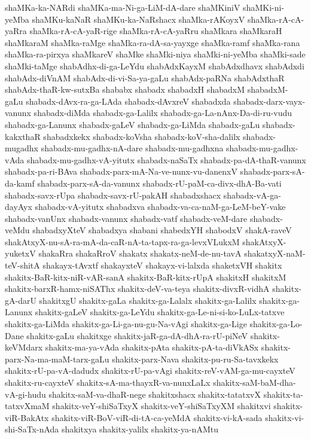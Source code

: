 {shaMKa-ka-NARdi
shaMKa-ma-Ni-ga-LiM-dA-dare
shaMKiniV
shaMKi-ni-yeMba
shaMKu-kaNaR
shaMKu-ka-NaRshacx
shaMka-rAKoyxV
shaMka-rA-cA-yaRra
shaMka-rA-cA-yaR-rige
shaMka-rA-cA-yaRru
shaMkara
shaMkaraH
shaMkaraM
shaMka-raMge
shaMka-ra-dA-sa-yayxge
shaMka-ramf
shaMka-rana
shaMka-ra-pirxya
shaMkareV
shaMke
shaMki-niya
shaMki-ni-yeMba
shaMki-sade
shaMki-taMge
shabAdhx-di-ga-LeYdu
shabAdxKayxM
shabAdxdhavx
shabAdxdi
shabAdx-diVnAM
shabAdx-di-vi-Sa-ya-gaLu
shabAdx-paRNa
shabAdxthaR
shabAdx-thaR-kw-sutxBa
shababx
shabadx
shabadxH
shabadxM
shabadxM-gaLu
shabadx-dAvx-ra-ga-LAda
shabadx-dAvxreV
shabadxda
shabadx-darx-vayx-vanunx
shabadx-diMda
shabadx-ga-Lalilx
shabadx-ga-La-nAnx-Da-di-ru-vudu
shabadx-ga-Lanunx
shabadx-gaLeV
shabadx-ga-LiMda
shabadx-gaLu
shabadx-kakxthaR
shabadxkekx
shabadx-koVsha
shabadx-koV-sha-dalilx
shabadx-mugadhx
shabadx-mu-gadhx-nA-dare
shabadx-mu-gadhxna
shabadx-mu-gadhx-vAda
shabadx-mu-gadhx-vA-yitutx
shabadx-naSaTx
shabadx-pa-dA-thaR-vanunx
shabadx-pa-ri-BAva
shabadx-parx-mA-Na-ve-nunx-vu-danenxV
shabadx-parx-sA-da-kamf
shabadx-parx-sA-da-vanunx
shabadx-rU-paM-ca-divx-dhA-Ba-vati
shabadx-savx-rUpa
shabadx-savx-rU-pakAH
shabadxshacx
shabadx-vA-ga-dayAyx
shabadx-vA-yitutx
shabadxva
shabadx-va-ca-naM-ga-LeM-beY-vake
shabadx-vanUnx
shabadx-vanunx
shabadx-vatf
shabadx-veM-dare
shabadx-veMdu
shabadxyXteV
shabadxya
shabani
shabedxYH
shabodxV
shakA-raveV
shakAtxyX-nu-sA-ra-mA-da-caR-nA-ta-tapx-ra-ga-levxVLukxM
shakAtxyX-yuketxV
shakaRra
shakaRroV
shakatx
shakatx-neM-de-nu-tavA
shakatxyX-naM-teV-shitA
shakayx-tAvxtf
shakayxteV
shakayx-vi-lalxda
shaketxVH
shakitx
shakitx-BaR-kitx-niR-vAR-sanA
shakitx-BaR-kitx-rUpA
shakitxH
shakitxM
shakitx-barxR-hamx-niSAThx
shakitx-deV-va-teya
shakitx-divxR-vidhA
shakitx-gA-darU
shakitxgU
shakitx-gaLa
shakitx-ga-Lalalx
shakitx-ga-Lalilx
shakitx-ga-Lanunx
shakitx-gaLeV
shakitx-ga-LeYdu
shakitx-ga-Le-ni-si-ko-LuLx-tatxve
shakitx-ga-LiMda
shakitx-ga-Li-ga-nu-gu-Na-vAgi
shakitx-ga-Lige
shakitx-ga-Lo-Dane
shakitx-gaLu
shakitxge
shakitx-jaR-ga-dA-dhA-ra-rU-piNeV
shakitx-keVMdarx
shakitx-ma-ya-vAda
shakitx-pAta
shakitx-pA-ta-diVkASx
shakitx-parx-Na-ma-maM-tarx-gaLu
shakitx-parx-Nava
shakitx-pu-ru-Sa-tavxkekx
shakitx-rU-pa-vA-dadudx
shakitx-rU-pa-vAgi
shakitx-reV-vAM-ga-mu-cayxteV
shakitx-ru-cayxteV
shakitx-sA-ma-thayxR-va-nunxLaLx
shakitx-saM-baM-dha-vA-gi-hudu
shakitx-saM-va-dhaR-nege
shakitxshacx
shakitx-tatatxvX
shakitx-ta-tatxvXmaM
shakitx-veY-shiSaTxyX
shakitx-veY-shiSaTxyXM
shakitxvi
shakitx-viR-BakAtx
shakitx-viR-BoV-viR-di-tA-ca-yeMdA
shakitx-vi-kA-sada
shakitx-vi-shi-SaTx-nAda
shakitxya
shakitx-yalilx
shakitx-ya-nAMtu
}
